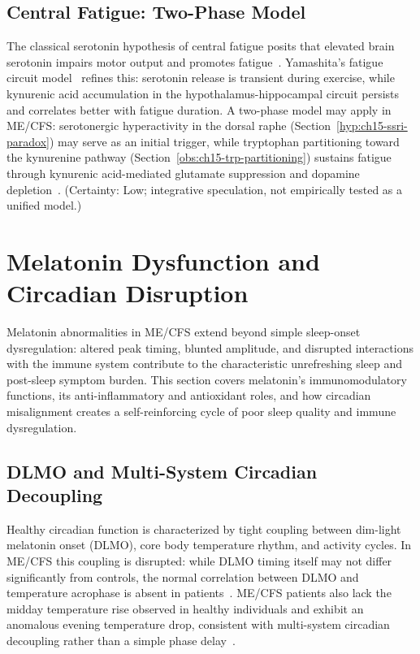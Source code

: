 \subsection{Central Fatigue: Two-Phase Model}

\begin{speculation}
\label{spec:ch15-central-fatigue-model}
The classical serotonin hypothesis of central fatigue posits that elevated brain serotonin impairs motor output and promotes fatigue~\cite{StClairGibson2004fatigue}. Yamashita's fatigue circuit model~\cite{Yamashita2020fatigue} refines this: serotonin release is transient during exercise, while kynurenic acid accumulation in the hypothalamus-hippocampal circuit persists and correlates better with fatigue duration. A two-phase model may apply in ME/CFS: serotonergic hyperactivity in the dorsal raphe (Section~\ref{hyp:ch15-ssri-paradox}) may serve as an initial trigger, while tryptophan partitioning toward the kynurenine pathway (Section~\ref{obs:ch15-trp-partitioning}) sustains fatigue through kynurenic acid-mediated glutamate suppression and dopamine depletion~\cite{Kavyani2022kynurenine}. (Certainty: Low; integrative speculation, not empirically tested as a unified model.)
\end{speculation}


\section{Melatonin Dysfunction and Circadian Disruption}
\label{sec:ch15-melatonin}

Melatonin abnormalities in ME/CFS extend beyond simple sleep-onset dysregulation: altered peak timing, blunted amplitude, and disrupted interactions with the immune system contribute to the characteristic unrefreshing sleep and post-sleep symptom burden. This section covers melatonin's immunomodulatory functions, its anti-inflammatory and antioxidant roles, and how circadian misalignment creates a self-reinforcing cycle of poor sleep quality and immune dysregulation.

\subsection{DLMO and Multi-System Circadian Decoupling}

Healthy circadian function is characterized by tight coupling between dim-light melatonin onset (DLMO), core body temperature rhythm, and activity cycles. In ME/CFS this coupling is disrupted: while DLMO timing itself may not differ significantly from controls, the normal correlation between DLMO and temperature acrophase is absent in patients~\cite{williams2001circadian,McCarthy2022circadian}. ME/CFS patients also lack the midday temperature rise observed in healthy individuals and exhibit an anomalous evening temperature drop, consistent with multi-system circadian decoupling rather than a simple phase delay~\cite{McCarthy2022circadian}.

